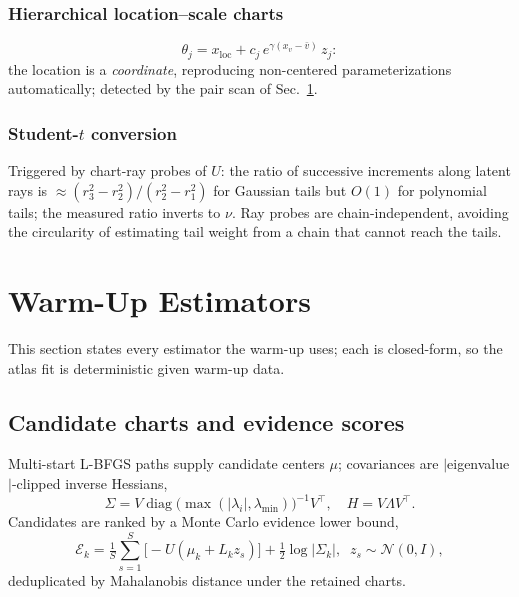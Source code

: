 \documentclass[10pt,journal,compsoc]{IEEEtran}
\begin{document}
\subsubsection{Hierarchical location--scale charts}
\begin{equation}
\theta_j=x_{\mathrm{loc}}+c_j\,e^{\gamma(x_v-\bar v)}\,z_j:
\label{eq:hierchart}
\end{equation}
the location is a \emph{coordinate}, reproducing non-centered
parameterizations \cite{papaspiliopoulos2007,betancourt2015} automatically;
detected by the pair scan of Sec.~\ref{sec:estimators}.

\subsubsection{Student-$t$ conversion}
Triggered by chart-ray probes of $U$: the ratio of successive increments
along latent rays is $\approx(r_3^2-r_2^2)/(r_2^2-r_1^2)$ for Gaussian
tails but $O(1)$ for polynomial tails; the measured ratio inverts to $\nu$.
Ray probes are chain-independent, avoiding the circularity of estimating
tail weight from a chain that cannot reach the tails.

\section{Warm-Up Estimators}\label{sec:estimators}
This section states every estimator the warm-up uses; each is closed-form,
so the atlas fit is deterministic given warm-up data.

\subsection{Candidate charts and evidence scores}
Multi-start L-BFGS paths supply candidate centers $\mu$; covariances are
$|$eigenvalue$|$-clipped inverse Hessians,
\begin{equation}
\Sigma=\!V\operatorname{diag}\bigl(\max(|\lambda_i|,\lambda_{\min})\bigr)^{-1}V^\top,
\quad H=V\Lambda V^\top\!.
\label{eq:clip}
\end{equation}
Candidates are ranked by a Monte Carlo evidence lower bound,
\begin{equation}
\mathcal E_k=\tfrac1S\sum_{s=1}^S\bigl[-U(\mu_k+L_kz_s)\bigr]
+\tfrac12\log|\Sigma_k|,\;\; z_s\sim\mathcal N(0,I),
\label{eq:elbo}
\end{equation}
deduplicated by Mahalanobis distance under the retained charts.
\end{document}
